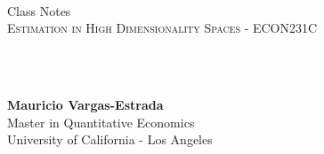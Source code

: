 {
	\parindent0pt
	\ \\ \ \\ \ \\

	\hrulefill
	\vspace{0.0cm}
	\begin{spacing}{1.1}
	{	
		\flushleft
		\fontsize{22pt}{44pt}\selectfont 
		Class Notes
	}\\
	\textsc{Estimation in High Dimensionality Spaces - ECON231C}
	\end{spacing}

	\ \\ \ \\
	{
		\textbf{Mauricio Vargas-Estrada}\\
		Master in Quantitative Economics\\
		University of California - Los Angeles\par
	}
	\ \\

	\hrulefill
}
